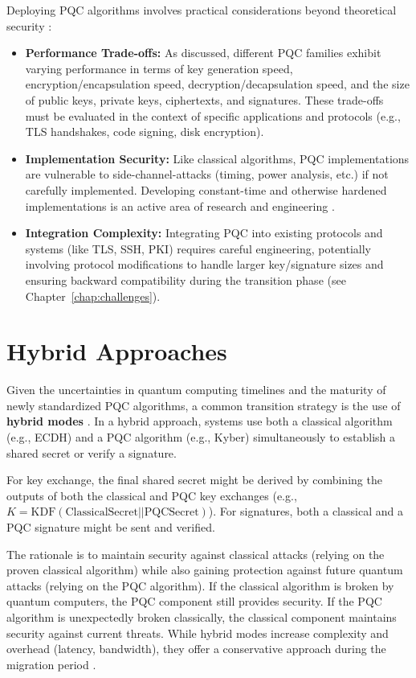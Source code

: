 Deploying PQC algorithms involves practical considerations beyond theoretical security \parencite{pqc_optimization_2024}:
\begin{itemize}
    \item \textbf{Performance Trade-offs:} As discussed, different PQC families exhibit varying performance in terms of key generation speed, encryption/encapsulation speed, decryption/decapsulation speed, and the size of public keys, private keys, ciphertexts, and signatures. These trade-offs must be evaluated in the context of specific applications and protocols (e.g., TLS handshakes, code signing, disk encryption).
    \item \textbf{Implementation Security:} Like classical algorithms, PQC implementations are vulnerable to \glspl{side-channel-attack} (timing, power analysis, etc.) if not carefully implemented. Developing constant-time and otherwise hardened implementations is an active area of research and engineering \parencite{side_channel_2024}.
    \item \textbf{Integration Complexity:} Integrating PQC into existing protocols and systems (like TLS, SSH, PKI) requires careful engineering, potentially involving protocol modifications to handle larger key/signature sizes and ensuring backward compatibility during the transition phase (see Chapter~\ref{chap:challenges}).
\end{itemize}

\section{Hybrid Approaches}\label{sec:hybrid_approaches_ch6}

Given the uncertainties in quantum computing timelines and the maturity of newly standardized PQC algorithms, a common transition strategy is the use of \textbf{hybrid modes} \parencite{hybrid_crypto_2024}. In a hybrid approach, systems use both a classical algorithm (e.g., ECDH) and a PQC algorithm (e.g., Kyber) simultaneously to establish a shared secret or verify a signature.

For key exchange, the final shared secret might be derived by combining the outputs of both the classical and PQC key exchanges (e.g., $K = \text{KDF}(\text{ClassicalSecret} || \text{PQCSecret})$). For signatures, both a classical and a PQC signature might be sent and verified.

The rationale is to maintain security against classical attacks (relying on the proven classical algorithm) while also gaining protection against future quantum attacks (relying on the PQC algorithm). If the classical algorithm is broken by quantum computers, the PQC component still provides security. If the PQC algorithm is unexpectedly broken classically, the classical component maintains security against current threats. While hybrid modes increase complexity and overhead (latency, bandwidth), they offer a conservative approach during the migration period \parencite{hybrid_protocols_2024, hybrid_performance_2024}.


